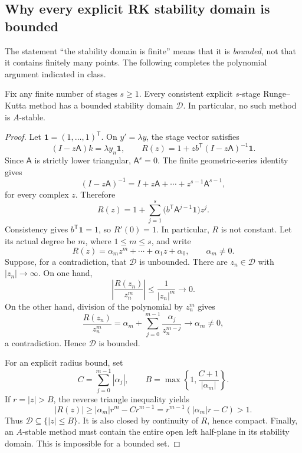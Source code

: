 \subsection{Why every explicit RK stability domain is bounded}

The statement ``the stability domain is finite'' means that it is
\emph{bounded}, not that it contains finitely many points. The
following completes the polynomial argument indicated in class.

\begin{theorem}\label{thm:bounded-explicit-rk-sep-16}
 Fix any finite number of stages \(s\geq1\). Every consistent explicit
 \(s\)-stage Runge--Kutta method has a bounded stability domain
 \(\mathcal D\). In particular, no such method is \(A\)-stable.
\end{theorem}

\begin{proof}
 Let \(\mathbf1=(1,\ldots,1)^{\mathsf T}\). On \(y'=\lambda y\),
 the stage vector satisfies
 \[
  (I-z\mathsf A)k=\lambda y_n\mathbf1,
  \qquad
  R(z)=1+z b^{\mathsf T}(I-z\mathsf A)^{-1}\mathbf1.
 \]
 Since \(\mathsf A\) is strictly lower triangular,
 \(\mathsf A^s=0\). The finite geometric-series identity gives
 \[
  (I-z\mathsf A)^{-1}
    =I+z\mathsf A+\cdots+z^{s-1}\mathsf A^{s-1},
 \]
 for every complex \(z\). Therefore
 \begin{equation}\label{eq:explicit-rk-polynomial-sep-16}
  R(z)=1+\sum_{j=1}^{s}
       \bigl(b^{\mathsf T}\mathsf A^{j-1}\mathbf1\bigr)z^j.
 \end{equation}
 Consistency gives \(b^{\mathsf T}\mathbf1=1\), so \(R'(0)=1\).
 In particular, \(R\) is not constant. Let its actual degree be
 \(m\), where \(1\leq m\leq s\), and write
 \[
  R(z)=\alpha_mz^m+\cdots+\alpha_1z+\alpha_0,
  \qquad \alpha_m\neq0.
 \]
 Suppose, for a contradiction, that \(\mathcal D\) is unbounded.
 There are \(z_n\in\mathcal D\) with \(|z_n|\to\infty\). On one hand,
 \[
  \left|\frac{R(z_n)}{z_n^m}\right|
     \leq\frac{1}{|z_n|^m}\longrightarrow0.
 \]
 On the other hand, division of the polynomial by \(z_n^m\) gives
 \[
  \frac{R(z_n)}{z_n^m}
    =\alpha_m+\sum_{j=0}^{m-1}\frac{\alpha_j}{z_n^{m-j}}
    \longrightarrow\alpha_m\neq0,
 \]
 a contradiction. Hence \(\mathcal D\) is bounded.

 For an explicit radius bound, set
 \[
  C=\sum_{j=0}^{m-1}|\alpha_j|,
  \qquad
  B=\max\left\{1,\frac{C+1}{|\alpha_m|}\right\}.
 \]
 If \(r=|z|>B\), the reverse triangle inequality yields
 \[
  |R(z)|\geq |\alpha_m|r^m-Cr^{m-1}
       =r^{m-1}(|\alpha_m|r-C)>1.
 \]
 Thus \(\mathcal D\subseteq\{|z|\leq B\}\). It is also closed by
 continuity of \(R\), hence compact. Finally, an \(A\)-stable method
 must contain the entire open left half-plane in its stability
 domain. This is impossible for a bounded set.
\end{proof}

